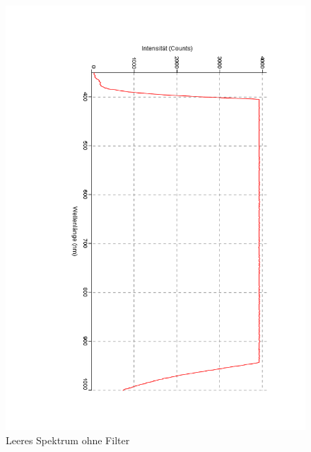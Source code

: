 \documentclass[12pt,a4paper]{article}
\begin{document}
\begin{figure}[H]
	\centering
	\includegraphics[scale=0.5,angle = 90,trim = 20mm 20mm 20mm 20mm]{./data/Spektro/Dunkel_Leer_DO_4_Kurz_Braun.pdf}
	\caption{Leeres Spektrum ohne Filter}
	\label{fig:FilterOhne}
\end{figure}
\end{document}
